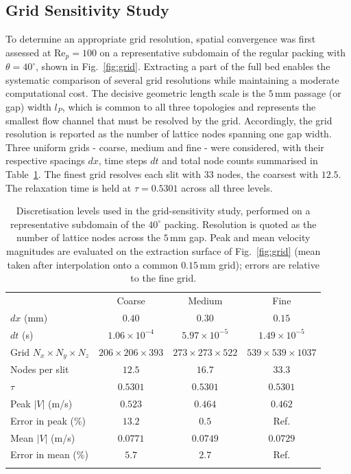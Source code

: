 \subsection{Grid Sensitivity Study}
\label{sec:numerics:grid}
To determine an appropriate grid resolution, spatial convergence was first assessed at Re$_p = 100$ on a representative subdomain of the regular packing with $\theta=40^\circ$, shown in Fig.~\ref{fig:grid}. Extracting a part of the full bed enables the systematic comparison of several grid resolutions while maintaining a moderate computational cost.
The decisive geometric length scale is the $5\,\mathrm{mm}$ passage (or gap) width $l_P$, which is common to all three topologies and represents the smallest flow channel that must be resolved by the grid. Accordingly, the grid resolution is reported as the number of lattice nodes spanning one gap width. Three uniform grids - coarse, medium and fine - were considered, with their respective spacings $dx$, time steps $dt$ and total node counts summarised in Table~\ref{tab:grid}. The finest grid resolves each slit with $33$ nodes, the coarsest with $12.5$.
The relaxation time is held at $\tau = 0.5301$ across all three levels.
\begin{table}[tbp]
\caption{Discretisation levels used in the grid-sensitivity study, performed on a representative subdomain of the $40^\circ$ packing. Resolution is quoted as the number of lattice nodes across the $5\,\mathrm{mm}$ gap. Peak and mean velocity magnitudes are evaluated on the extraction surface of Fig.~\ref{fig:grid} (mean taken after interpolation onto a common $0.15\,\mathrm{mm}$ grid); errors are relative to the fine grid.}
\label{tab:grid}

\begin{tabular}{lccc}
\hline\noalign{\smallskip}
 & Coarse & Medium & Fine \\
\noalign{\smallskip}\hline\noalign{\smallskip}
$dx$ (mm)                  & $0.40$               & $0.30$               & $0.15$ \\
$dt$ (s)                   & $1.06\times10^{-4}$  & $5.97\times10^{-5}$  & $1.49\times10^{-5}$ \\
Grid $N_x\times N_y\times N_z$   & $206\times206\times393$ & $273\times273\times522$ & $539\times539\times1037$ \\
Nodes per slit                   & $12.5$               & $16.7$               & $33.3$ \\
$\tau$                           & $0.5301$             & $0.5301$             & $0.5301$ \\
\noalign{\smallskip}\hline\noalign{\smallskip}
Peak $|V|$ (m/s)            & $0.523$              & $0.464$              & $0.462$ \\
Error in peak (\%)               & $13.2$               & $0.5$                & Ref. \\
Mean $|V|$ (m/s)            & $0.0771$             & $0.0749$             & $0.0729$ \\
Error in mean (\%)               & $5.7$                & $2.7$                & Ref. \\
\noalign{\smallskip}\hline
\end{tabular}
\end{table}

